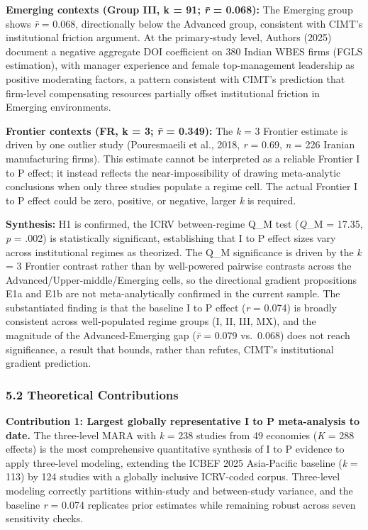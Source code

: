 \documentclass[
  12pt,a4paper]{article}
\begin{document}
\textbf{Emerging contexts (Group III, k = 91; \emph{r̄} = 0.068):} The
Emerging group shows \emph{r̄} = 0.068, directionally below the Advanced
group, consistent with CIMT's institutional friction argument. At the
primary-study level, Authors (2025) document a negative aggregate DOI
coefficient on 380 Indian WBES firms (FGLS estimation), with manager
experience and female top-management leadership as positive moderating
factors, a pattern consistent with CIMT's prediction that firm-level
compensating resources partially offset institutional friction in
Emerging environments.

\textbf{Frontier contexts (FR, k = 3; \emph{r̄} = 0.349):} The \emph{k} =
3 Frontier estimate is driven by one outlier study (Pouresmaeili et al.,
2018, \emph{r} = 0.69, \emph{n} = 226 Iranian manufacturing firms). This
estimate cannot be interpreted as a reliable Frontier I to P effect; it
instead reflects the near-impossibility of drawing meta-analytic
conclusions when only three studies populate a regime cell. The actual
Frontier I to P effect could be zero, positive, or negative, larger
\emph{k} is required.

\textbf{Synthesis:} H1 is confirmed, the ICRV between-regime Q\_M test
(\emph{Q}\_M = 17.35, \emph{p} = .002) is statistically significant,
establishing that I to P effect sizes vary across institutional regimes
as theorized. The Q\_M significance is driven by the \emph{k} = 3
Frontier contrast rather than by well-powered pairwise contrasts across
the Advanced/Upper-middle/Emerging cells, so the directional gradient
propositions E1a and E1b are not meta-analytically confirmed in the
current sample. The substantiated finding is that the baseline I to P
effect (\emph{r} = 0.074) is broadly consistent across well-populated
regime groups (I, II, III, MX), and the magnitude of the
Advanced-Emerging gap (\emph{r̄} = 0.079 vs.~0.068) does not reach
significance, a result that bounds, rather than refutes, CIMT's
institutional gradient prediction.

\hypertarget{theoretical-contributions}{%
\subsubsection{5.2 Theoretical
Contributions}\label{theoretical-contributions}}

\textbf{Contribution 1: Largest globally representative I to P
meta-analysis to date.} The three-level MARA with \emph{k} = 238 studies
from 49 economies (\emph{K} = 288 effects) is the most comprehensive
quantitative synthesis of I to P evidence to apply three-level modeling,
extending the ICBEF 2025 Asia-Pacific baseline (\emph{k} = 113) by 124
studies with a globally inclusive ICRV-coded corpus. Three-level
modeling correctly partitions within-study and between-study variance,
and the baseline \emph{r} = 0.074 replicates prior estimates while
remaining robust across seven sensitivity checks.
\end{document}

